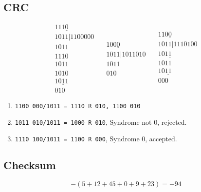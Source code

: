 \documentclass{article}
\begin{document}
\begin{multicols}{2}
\subsection*{CRC}
\[
\begin{array}{r}
      \underline{1110\phantom{000}} \\
      [-2pt] 1011 | 1100000 \\
      \underline{1011\phantom{000}} \\
        1110\phantom{00} \\
        \underline{1011\phantom{00}} \\
         1010\phantom{0}\\
         \underline{1011\phantom{0}}\\
         010
\end{array} \quad \begin{array}{r} \underline{1000\phantom{000}} \\
      [-2pt] 1011 | 1011010 \\
      \underline{1011\phantom{000}} \\
        010
\end{array} \quad \begin{array}{r}
      \underline{1100\phantom{000}} \\
      [-2pt] 1011 | 1110100 \\
      \underline{1011\phantom{000}} \\
        1011\phantom{00} \\
        \underline{1011\phantom{00}} \\
         000\\
         \end{array}
\]
\begin{enumerate}
    \item \verb|1100 000/1011 = 1110 R 010, 1100 010|
    \item \verb|1011 010/1011 = 1000 R 010|, Syndrome not 0, rejected.
    \item \verb|1110 100/1011 = 1100 R 000|, Syndrome 0, accepted.
\end{enumerate}
\subsection*{Checksum}
\[-(5+12+45+0+9+23) = -94\]
\end{multicols}
\end{document}
